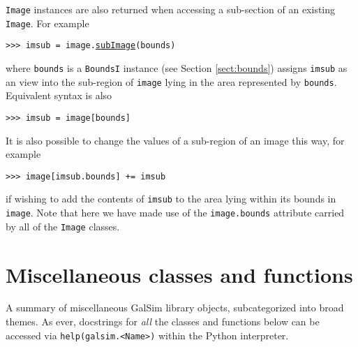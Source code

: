 \documentclass[preprint,10pt]{../../devel/modules/aastex}
\begin{document}
\texttt{Image} instances are also returned when
accessing a sub-section of an existing \texttt{Image}.  For example

\texttt{>>> imsub = image.\href{http://galsim-developers.github.io/GalSim/classgalsim_1_1image_1_1_image.html\#a968b8dce7fb7155a09fe44c064a285aa}{subImage}(bounds)}

where \texttt{bounds} is a \texttt{BoundsI} instance (see Section
\ref{sect:bounds}) assigns \texttt{imsub} as an view into
the sub-region of \texttt{image} lying in the area represented by
\texttt{bounds}.  Equivalent syntax is also

\texttt{>>> imsub = image[bounds]}

It is also possible to change the values of a sub-region of an image
this way, for example

\texttt{>>> image[imsub.bounds] += imsub}

if wishing to add the contents of \texttt{imsub} to the area lying
within its bounds in \texttt{image}.  Note that here we have made use of
the \texttt{image.bounds} attribute carried by all of the \texttt{Image}
classes.

\section{Miscellaneous classes and functions}\label{sect:misc}

A summary of miscellaneous GalSim library objects, subcategorized into
broad themes.  As ever, docstrings for \emph{all} the classes and
functions below can be accessed via \texttt{help(galsim.<Name>)}
within the Python interpreter.
\end{document}
